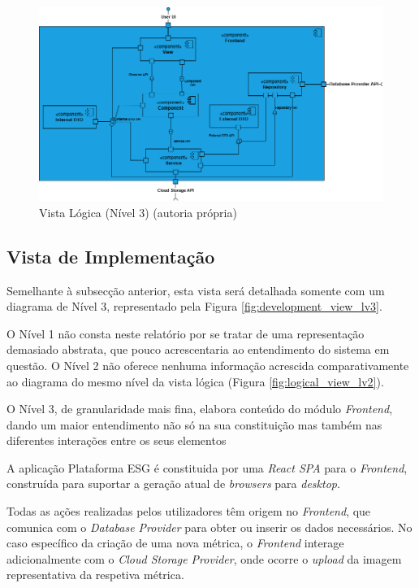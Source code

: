 \begin{landscape}
\begin{figure}[p]
    \centering
    \includegraphics[width=\linewidth,keepaspectratio]{frontmatter/assets/diagrams/Logical View/Logical View Lv3.drawio.png}
    \caption{Vista Lógica (Nível 3) (autoria própria)}
    \label{fig:logical_view_lv3}
\end{figure}
\end{landscape}

\subsection{Vista de Implementação}

Semelhante à subsecção anterior, esta vista será detalhada somente com um diagrama de Nível 3, representado pela Figura \ref{fig:development_view_lv3}.

O Nível 1 não consta neste relatório por se tratar de uma representação demasiado abstrata, que pouco acrescentaria ao entendimento do sistema em questão. O Nível 2 não oferece nenhuma informação acrescida comparativamente ao diagrama do mesmo nível da vista lógica (Figura \ref{fig:logical_view_lv2}).

O Nível 3, de granularidade mais fina, elabora conteúdo do módulo \textit{Frontend}, dando um maior  entendimento não só na sua constituição mas também nas diferentes interações entre os seus elementos 

A aplicação Plataforma ESG é constituida por uma \textit{React \gls{SPA}} para o \textit{Frontend}, construída para suportar a geração atual de \textit{browsers} para \textit{desktop}.

Todas as ações realizadas pelos utilizadores têm origem no \textit{Frontend}, que comunica com o \textit{Database Provider} para obter ou inserir os dados necessários. No caso específico da criação de uma nova métrica, o \textit{Frontend} interage adicionalmente com o \textit{Cloud Storage Provider}, onde ocorre o \textit{upload} da imagem representativa da respetiva métrica.


